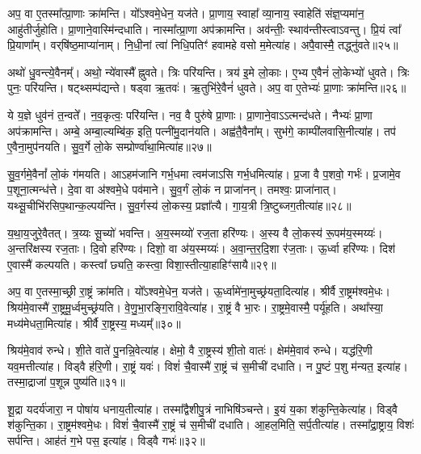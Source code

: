 अप॒ वा ए॒तस्मा᳚त्प्रा॒णाः क्रा॑मन्ति।
यो᳚ऽश्वमे॒धेन॒ यज॑ते।
प्रा॒णाय॒ स्वाहा᳚ व्या॒नाय॒ स्वाहेति॑ संज्ञ॒प्यमा॑न॒ आहु॑तीर्जुहोति।
प्रा॒णाने॒वास्मि॑न्दधाति।
नास्मा᳚त्प्रा॒णा अप॑क्रामन्ति।
अव॑न्तीः॒ स्थाव॑न्तीस्त्वा\-ऽवन्तु।
प्रि॒यं त्वा᳚ प्रि॒याणा᳚म्।
वर्‌\mbox{}षि॑ष्ठ॒माप्या॑नाम्।
नि॒धी॒नां त्वा॑ निधि॒पतिꣳ॑ हवामहे वसो म॒मेत्या॑ह।
अपै॒वास्मै॒ तद्ध्नु॑वते॥२५॥\ip

अथो॑ धु॒वन्त्ये॒वैनम्᳚।
अथो॒ न्ये॑वास्मै᳚ ह्नुवते।
त्रिः परि॑यन्ति।
त्रय॑ इ॒मे लो॒काः।
ए॒भ्य ए॒वैनं॑ लो॒केभ्यो॑ धुवते।
त्रिः पुनः॒ परि॑यन्ति।
षट्थ्सम्प॑द्यन्ते।
षड्वा ऋ॒तवः॑।
ऋ॒तुभि॑रे॒वैनं॑ धुवते।
अप॒ वा ए॒तेभ्यः॑ प्रा॒णाः क्रा॑मन्ति॥२६॥\ip

ये य॒ज्ञे धुव॑नं त॒न्वते᳚।
न॒व॒कृत्वः॒ परि॑यन्ति।
नव॒ वै पुरु॑षे प्रा॒णाः।
प्रा॒णाने॒वाऽऽत्मन्द॑धते।
नैभ्यः॑ प्रा॒णा अप॑क्रामन्ति।
अम्बे॒ अम्बा॒ल्यम्बि॑क॒ इति॒ पत्नी॑मु॒दान॑यति।
अह्व॑तै॒वैना᳚म्।
सुभ॑गे॒ काम्पी॑लवासि॒नीत्या॑ह।
तप॑ ए॒वैना॒मुप॑नयति।
सु॒व॒र्गे लो॒के सम्प्रोर्ण्वा॑था॒मित्या॑ह॥२७॥\ip

सु॒व॒र्गमे॒वैनां᳚ लो॒कं ग॑मयति।
आऽहम॑जानि गर्भ॒धमा त्वम॑जाऽसि गर्भ॒धमित्या॑ह।
प्र॒जा वै प॒शवो॒ गर्भः॑।
प्र॒जामे॒व प॒शूना॒त्मन्ध॑त्ते।
दे॒वा वा अ॑श्वमे॒धे पव॑माने।
सु॒व॒र्गं लो॒कं न प्राजा॑नन्।
तमश्वः॒ प्राजा॑नात्।
यथ्सू॒चीभि॑रसिप॒थान्क॒ल्पय॑न्ति।
सु॒व॒र्गस्य॑ लो॒कस्य॒ प्रज्ञा᳚त्यै।
गा॒य॒त्री त्रि॒ष्टुब्जग॒तीत्या॑ह॥२८॥\ip

य॒था॒\-य॒जु\-रे॒वै\-तत्।
त्र॒य्यः सू॒च्यो॑ भवन्ति।
अ॒य॒स्मय्यो॑ रज॒ता हरि॑ण्यः।
अ॒स्य वै लो॒कस्य॑ रू॒पम॑य॒स्मय्यः॑।
अ॒न्तरि॑क्षस्य रज॒ताः।
दि॒वो हरि॑ण्यः।
दिशो॒ वा अ॑य॒स्मय्यः॑।
अ॒वा॒न्त॒र॒दि॒शा र॑ज॒ताः।
ऊ॒र्ध्वा हरि॑ण्यः।
दिश॑ ए॒वास्मै॑ कल्पयति।
कस्त्वा᳚ छ्यति॒ कस्त्वा॒ विशा॒स्तीत्या॒हाहिꣳ॑सायै॥२९॥\ip\anuvakamend[ह्नु॒व॒ते॒ क्रा॒म॒न्त्यू॒र्ण्वा॒था॒मित्या॑ह॒ जग॒तीत्या॑ह कल्पय॒त्येकं॑ च]

अप॒ वा ए॒तस्मा॒च्छ्री रा॒ष्ट्रं क्रा॑मति।
यो᳚ऽश्वमे॒धेन॒ यज॑ते।
ऊ॒र्ध्वामे॑ना॒मुच्छ्र॑यता॒दित्या॑ह।
श्रीर्वै रा॒ष्ट्रम॑श्वमे॒धः।
श्रिय॑मे॒वास्मै॑ रा॒ष्ट्रमू॒र्ध्वमुच्छ्र॑यति।
वे॒णु॒भा॒रङ्गि॒रावि॒वेत्या॑ह।
रा॒ष्ट्रं वै भा॒रः।
रा॒ष्ट्रमे॒वास्मै॒ पर्यू॑हति।
अथा᳚स्या॒ मध्य॑मेधता॒मित्या॑ह।
श्रीर्वै रा॒ष्ट्रस्य॒ मध्यम्᳚॥३०॥\ip

श्रिय॑मे॒वाव॑ रुन्धे।
शी॒ते वाते॑ पु॒नन्नि॒वेत्या॑ह।
क्षेमो॒ वै रा॒ष्ट्रस्य॑ शी॒तो वातः॑।
क्षेम॑मे॒वाव॑ रुन्धे।
यद्ध॑रि॒णी यव॒मत्तीत्या॑ह।
विड्वै ह॑रि॒णी।
रा॒ष्ट्रं यवः॑।
विशं॑ चै॒वास्मै॑ रा॒ष्ट्रं च॑ स॒मीची॑ दधाति।
न पु॒ष्टं प॒शु म॑न्यत॒ इत्या॑ह।
तस्मा॒द्राजा॑ प॒शून्न पुष्य॑ति॥३१॥\ip

शू॒द्रा यदर्य॑जारा॒ न पोषा॑य धनाय॒तीत्या॑ह।
तस्मा᳚द्वैशीपु॒त्रं नाभिषि॑ञ्चन्ते।
इ॒यं य॒का श॑कुन्ति॒केत्या॑ह।
विड्वै श॑कुन्ति॒का।
रा॒ष्ट्रम॑श्वमे॒धः।
विशं॑ चै॒वास्मै॑ रा॒ष्ट्रं च॑ स॒मीची॑ दधाति।
आ॒हल॒मिति॒ सर्प॒तीत्या॑ह।
तस्मा᳚द्रा॒ष्ट्राय॒ विशः॑ सर्पन्ति।
आह॑तं ग॒भे पस॒ इत्या॑ह।
विड्वै गभः॑॥३२॥\ip

